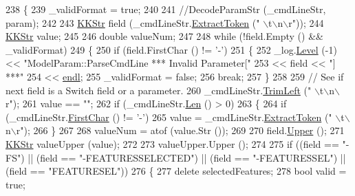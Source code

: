 \begin{DoxyCode}
238 \{
239   \_validFormat = \textcolor{keyword}{true};
240 
241   \textcolor{comment}{//DecodeParamStr (\_cmdLineStr, param);}
242 
243   \hyperlink{class_k_k_b_1_1_k_k_str}{KKStr}  field (\_cmdLineStr.\hyperlink{class_k_k_b_1_1_k_k_str_acc31c95308d6d699debde883c11e5802}{ExtractToken} (\textcolor{stringliteral}{" \(\backslash\)t\(\backslash\)n\(\backslash\)r"}));
244   \hyperlink{class_k_k_b_1_1_k_k_str}{KKStr}  value;
245 
246   \textcolor{keywordtype}{double}  valueNum;
247 
248   \textcolor{keywordflow}{while}  (!field.Empty ()  &&  \_validFormat)
249   \{
250     \textcolor{keywordflow}{if}  (field.FirstChar () != \textcolor{charliteral}{'-'})
251     \{
252       \_log.\hyperlink{class_k_k_b_1_1_run_log_a32cf761d7f2e747465fd80533fdbb659}{Level} (-1) << \textcolor{stringliteral}{"ModelParam::ParseCmdLine  *** Invalid Parameter["}
253         << field << \textcolor{stringliteral}{"] ***"}
254         << \hyperlink{namespace_k_k_b_ad1f50f65af6adc8fa9e6f62d007818a8}{endl};
255       \_validFormat = \textcolor{keyword}{false};
256       \textcolor{keywordflow}{break};
257     \}
258 
259     \textcolor{comment}{// See if next field is a Switch field or a parameter.}
260     \_cmdLineStr.\hyperlink{class_k_k_b_1_1_k_k_str_af7c102c53103ddff3f48270b4a198c89}{TrimLeft} (\textcolor{stringliteral}{" \(\backslash\)t\(\backslash\)n\(\backslash\)r"});
261     value == \textcolor{stringliteral}{""};
262     \textcolor{keywordflow}{if}  (\_cmdLineStr.\hyperlink{class_k_k_b_1_1_k_k_str_a869142d4855517c5c237afcb25dbbe36}{Len} () > 0)
263     \{
264       \textcolor{keywordflow}{if}  (\_cmdLineStr.\hyperlink{class_k_k_b_1_1_k_k_str_ac20e69c629b985c6569af914d9cc3e8c}{FirstChar} () != \textcolor{charliteral}{'-'})
265         value = \_cmdLineStr.\hyperlink{class_k_k_b_1_1_k_k_str_acc31c95308d6d699debde883c11e5802}{ExtractToken} (\textcolor{stringliteral}{" \(\backslash\)t\(\backslash\)n\(\backslash\)r"});
266     \}
267 
268     valueNum = atof (value.Str ()); 
269 
270     field.\hyperlink{class_k_k_b_1_1_k_k_str_a66ea0feabc94da88591b56a683695bd9}{Upper} ();
271     \hyperlink{class_k_k_b_1_1_k_k_str}{KKStr} valueUpper (value);
272 
273     valueUpper.Upper ();
274 
275     \textcolor{keywordflow}{if}  ((field == \textcolor{stringliteral}{"-FS"})  ||  (field == \textcolor{stringliteral}{"-FEATURESSELECTED"})  ||  (field == \textcolor{stringliteral}{"-FEATURESSEL"})  ||  (field ==
       \textcolor{stringliteral}{"FEATURESEL"}))
276     \{
277       \textcolor{keyword}{delete}  selectedFeatures;
278       \textcolor{keywordtype}{bool}  valid = \textcolor{keyword}{true};

\end{DoxyCode}
